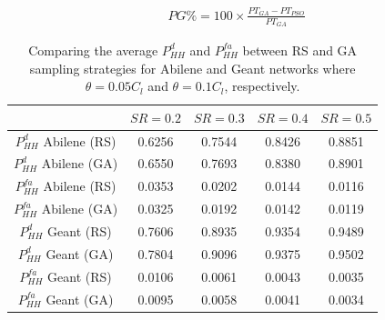 \begin{equation}\label{DefPG}
\begin{aligned}
PG \% = 100 \times \frac{PT_{GA}-PT_{PSO}}{PT_{GA}}
\end{aligned}
\end{equation}

\begin{table}
	\centering
		\begin{tabular}{| c | c | c | c | c |}
		\hline
                                   & $SR=0.2$ & $SR=0.3$ & $SR=0.4$ & $SR=0.5$   \\ \hline
      $P^{d}_{HH}$ Abilene  (RS)   & 0.6256 & 0.7544 & 0.8426 & 0.8851 \\ \hline
      $P^{d}_{HH}$ Abilene  (GA)   & 0.6550 & 0.7693 & 0.8380 & 0.8901 \\ \hline
      $P^{fa}_{HH}$ Abilene   (RS) & 0.0353 & 0.0202 & 0.0144 & 0.0116 \\ \hline
      $P^{fa}_{HH}$ Abilene   (GA) & 0.0325 & 0.0192 & 0.0142 & 0.0119 \\ \hline
      $P^{d}_{HH}$ Geant   (RS)    & 0.7606 & 0.8935 & 0.9354 & 0.9489 \\ \hline
      $P^{d}_{HH}$ Geant   (GA)    & 0.7804 & 0.9096 & 0.9375 & 0.9502 \\ \hline
      $P^{fa}_{HH}$ Geant  (RS)    & 0.0106 & 0.0061 & 0.0043 & 0.0035 \\ \hline
      $P^{fa}_{HH}$ Geant  (GA)    & 0.0095 & 0.0058 & 0.0041 & 0.0034 \\ \hline
    \end{tabular}
	\vspace{0.15cm}
  	\caption{{Comparing the average $P^{d}_{HH}$ and $P^{fa}_{HH}$ between RS and GA sampling strategies for Abilene and Geant networks where $\theta=0.05 C_{l}$ and $\theta=0.1 C_{l}$, respectively.}}
	\label{tab:SNIPERPdPfaHH}
\end{table}


